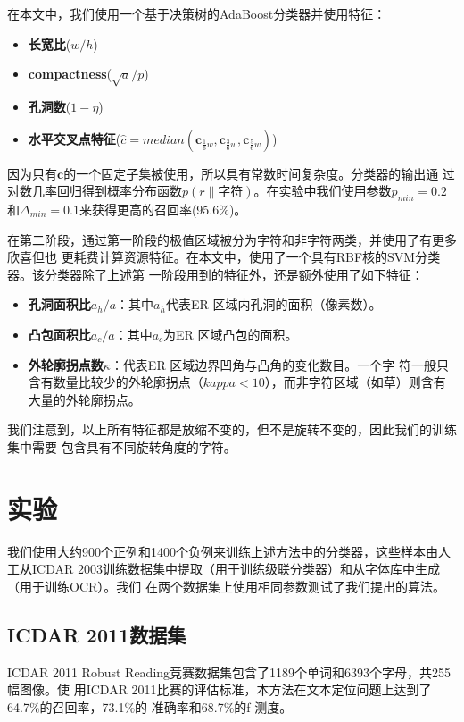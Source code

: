 \documentclass[UTF8]{article}
\begin{document}
在本文中，我们使用一个基于决策树的AdaBoost分类器并使用特征：

\begin{itemize}
\item \textbf{长宽比}($w/h$)
\item \textbf{compactness}($\sqrt{a}/p$)
\item \textbf{孔洞数}($1-\eta$)
\item \textbf{水平交叉点特征}($\hat{c}=median(\mathbf{c}_{\frac{1}{6}w}, \mathbf{c}_{\frac{3}{6}w}, \mathbf{c}_{\frac{5}{6}w})$)
\end{itemize}

因为只有$\mathbf{c}$的一个固定子集被使用，所以具有常数时间复杂度。分类器的输出通
过对数几率回归得到概率分布函数$p(r\|字符)$。在实验中我们使用参数$p_{min} = 0.2$
和$\Delta_{min}=0.1$来获得更高的召回率(95.6\%)。

在第二阶段，通过第一阶段的极值区域被分为字符和非字符两类，并使用了有更多欣喜但也
更耗费计算资源特征。在本文中，使用了一个具有RBF核的SVM分类器。该分类器除了上述第
一阶段用到的特征外，还是额外使用了如下特征：

\begin{itemize}
\item \textbf{孔洞面积比$a_h/a$}：其中$a_h$代表ER 区域内孔洞的面积（像素数）。
\item \textbf{凸包面积比$a_c/a$}：其中$a_c$为ER 区域凸包的面积。
\item \textbf{外轮廓拐点数$\kappa$}：代表ER 区域边界凹角与凸角的变化数目。一个字
  符一般只含有数量比较少的外轮廓拐点（$kappa < 10$），而非字符区域（如草）则含有
  大量的外轮廓拐点。
\end{itemize}

我们注意到，以上所有特征都是放缩不变的，但不是旋转不变的，因此我们的训练集中需要
包含具有不同旋转角度的字符。

\section{实验}

我们使用大约900个正例和1400个负例来训练上述方法中的分类器，这些样本由人工从ICDAR
2003训练数据集中提取（用于训练级联分类器）和从字体库中生成（用于训练OCR）。我们
在两个数据集上使用相同参数测试了我们提出的算法。

\subsection{ICDAR 2011数据集}

ICDAR 2011 Robust Reading竞赛数据集包含了1189个单词和6393个字母，共255幅图像。使
用ICDAR 2011比赛的评估标准，本方法在文本定位问题上达到了64.7\%的召回率，73.1\%的
准确率和68.7\%的f-测度。
\end{document}
